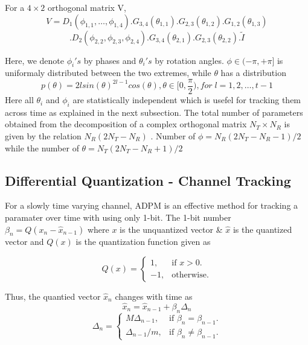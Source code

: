 \documentclass[conference]{IEEEtran}
\begin{document}
For a $4 \times 2$ orthogonal matrix V,
$$V = D_{1}(\phi_{1,1},\ldots,\phi_{1,4}).G_{3,4}(\theta_{1,1}) .G_{2,3}(\theta_{1,2}) .G_{1,2}(\theta_{1,3})$$
\vspace{-1.4em}
\hspace{1pt}$$.D_{2}(\phi_{2,2},\phi_{2,3},\phi_{2,4}) .G_{3,4}(\theta_{2,1}) .G_{2,3}(\theta_{2,2}).\tilde{I}$$

Here, we denote $\phi_{i}'s$ by phases and $\theta_{i}'s$ by rotation angles. $\phi \in (-\pi, + \pi]$ is uniformaly distributed between the two extremes\cite{4114278}, while $\theta$ has a distribution
\begin{equation}
p(\theta) = 2lsin(\theta)^{2l-1}cos(\theta), \theta \in [0, \frac{\pi}{2}), for \; l = 1,2,\ldots,t-1
\end{equation}
Here all $\theta_i$ and $\phi_i$ are statistically independent which is usefel for tracking them across time as explained in the next subsection. The total number of parameters obtained from the decomposition of a complex orthogonal matrix $N_{T} \times N_{R} $ is given by the relation $N_{R}(2N_{T} - N_{R}) $ \cite{4114278}. Number of $\phi = N_{R}(2N_{T} - N_{R}-1)/2$ while the number of $\theta = N_{T}(2N_{T} - N_{R}+1)/2$

\subsection{Differential Quantization - Channel Tracking}
\label{quantiz}
For a slowly time varying channel, ADPM is an effective method for tracking a paramater over time with using only 1-bit. The 1-bit number $\beta_{n} = Q(x_{n} - \hat{x}_{n-1})$ where $x$ is the unquantized vector \& $\hat{x}$ is the quantized vector and $Q(x)$ is the quantization function given as

\begin{equation}
  Q(x)=\begin{cases}
    1, & \text{if $x>0$}.\\
    -1, & \text{otherwise}.
  \end{cases}
\end{equation}

Thus, the quantied vector $\hat{x}_n$ changes with time as
\begin{equation}
\hat{x}_{n} = \hat{x}_{n-1} + \beta_{n}\Delta_{n}
\end{equation}
\begin{equation}
\Delta_{n} = \begin{cases}
    M \Delta_{n-1}, & \text{if $\beta_{n} = \beta_{n-1}$}.\\
    \Delta_{n-1}/m , & \text{if $\beta_{n} \neq \beta_{n-1}$}.
  \end{cases}
\end{equation}
\end{document}
